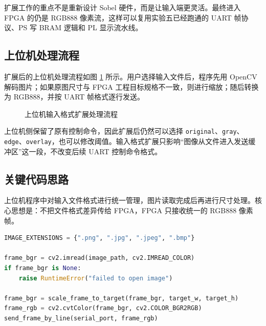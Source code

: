\documentclass[12pt,a4paper]{ctexart}
\begin{document}
扩展工作的重点不是重新设计 Sobel 硬件，而是让输入端更灵活。最终进入 FPGA 的仍是 RGB888 像素流，这样可以复用实验五已经跑通的 UART 帧协议、PS 写 BRAM 逻辑和 PL 显示流水线。

\subsection{上位机处理流程}

扩展后的上位机处理流程如图 \ref{fig:host-flow} 所示。用户选择输入文件后，程序先用 OpenCV 解码图片；如果原图尺寸与 FPGA 工程目标规格不一致，则进行缩放；随后转换为 RGB888，并按 UART 帧格式逐行发送。

\begin{figure}[H]
\centering
{}
\caption{上位机输入格式扩展处理流程}
\label{fig:host-flow}
\end{figure}

上位机侧保留了原有控制命令，因此扩展后仍然可以选择 \verb|original|、\verb|gray|、\verb|edge|、\verb|overlay|，也可以修改阈值。输入格式扩展只影响“图像从文件进入发送缓冲区”这一段，不改变后续 UART 控制命令格式。

\subsection{关键代码思路}

上位机程序中对输入文件格式进行统一管理，图片读取完成后再进行尺寸处理。核心思想是：不把文件格式差异传给 FPGA，FPGA 只接收统一的 RGB888 像素帧。

\begin{lstlisting}[language=Python,caption={上位机新增图片格式支持思路}]
IMAGE_EXTENSIONS = {".png", ".jpg", ".jpeg", ".bmp"}

frame_bgr = cv2.imread(image_path, cv2.IMREAD_COLOR)
if frame_bgr is None:
    raise RuntimeError("failed to open image")

frame_bgr = scale_frame_to_target(frame_bgr, target_w, target_h)
frame_rgb = cv2.cvtColor(frame_bgr, cv2.COLOR_BGR2RGB)
send_frame_by_line(serial_port, frame_rgb)
\end{lstlisting}
\end{document}
